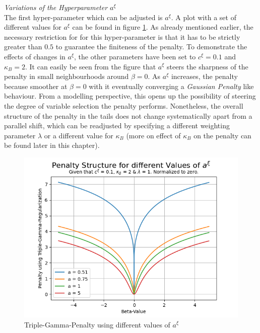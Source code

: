 \documentclass[12pt,a4paper]{article}
\begin{document}
\textit{Variations of the Hyperparameter $a^\xi$}\\

The first hyper-parameter which can be adjusted is $a^\xi$. A plot with a set of different values for $a^\xi$ can be found in figure \ref{fig:VariationInA}. As already mentioned earlier, the necessary restriction for for this hyper-parameter is that it has to be strictly greater than $0.5$ to guarantee the finiteness of the penalty. To demonstrate the effects of changes in $a^\xi$, the other parameters have been set to $c^\xi=0.1$ and $\kappa_B=2$. It can easily be seen from the figure that $a^\xi$ steers the sharpness of the penalty in small neighbourhoods around $\beta=0$. As $a^\xi$ increases, the penalty because smoother at $\beta=0$ with it eventually converging a \textit{Gaussian Penalty} like behaviour. From a modelling perspective, this opens up the possibility of steering the degree of variable selection the penalty performs. Nonetheless, the overall structure of the penalty in the tails does not change systematically apart from a parallel shift, which can be readjusted by specifying a different weighting parameter $\lambda$ or a different value for $\kappa_B$ (more on effect of $\kappa_B$ on the penalty can be found later in this chapter).\\ 

\begin{figure}[!h]
\centering
\includegraphics[scale=0.75]{../02_simulation/021_simulation_figures/TGPenalty_ChangeInA.png}
\caption{Triple-Gamma-Penalty using different values of $a^\xi$}
\label{fig:VariationInA}
\end{figure}
\end{document}
